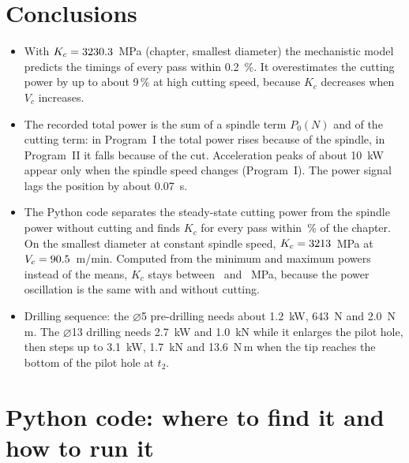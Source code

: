 \documentclass[11pt,a4paper]{article}
\begin{document}
\section{Conclusions}
\begin{itemize}
  \item With $K_c=3230.3$~MPa (chapter, smallest diameter) the mechanistic model
        predicts the timings of every pass within \SI{0.2}{\percent}. It overestimates
        the cutting power by up to about 9\,\% at high cutting speed, because $K_c$
        decreases when $V_c$ increases.
  \item The recorded total power is the sum of a spindle term $P_0(N)$ and of the
        cutting term: in Program~I the total power rises because of the spindle, in
        Program~II it falls because of the cut. Acceleration peaks of about \SI{10}{kW}
        appear only when the spindle speed changes (Program~I). The power signal lags
        the position by about \SI{0.07}{s}.
  \item The Python code separates the steady-state cutting power from the spindle power
        without cutting and finds $K_c$ for every pass within \KcDevMax\,\% of the
        chapter. On the smallest diameter at constant spindle speed,
        $K_c=3213$~MPa at $V_c=90.5$~m/min. Computed from the minimum and maximum
        powers instead of the means, $K_c$ stays between \KcRangeMin\ and
        \KcRangeMax~MPa, because the power oscillation is the same with and without
        cutting.
  \item Drilling sequence: the $\varnothing$5 pre-drilling needs about 1.2~kW, 643~N and
        2.0~N\,m. The $\varnothing$13 drilling needs 2.7~kW and 1.0~kN while it enlarges
        the pilot hole, then steps up to 3.1~kW, 1.7~kN and 13.6~N\,m when the tip
        reaches the bottom of the pilot hole at $t_2$.
\end{itemize}

\appendix
\section{Python code: where to find it and how to run it}\label{app:code}
\end{document}
